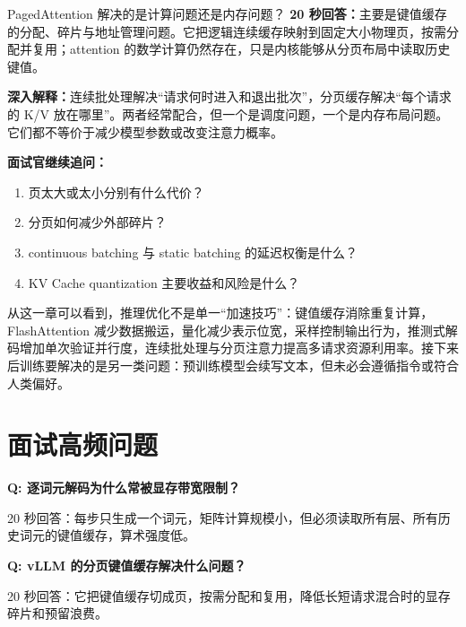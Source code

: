 \begin{interviewbox}{PagedAttention 解决的是计算问题还是内存问题？}
\textbf{20 秒回答：}主要是键值缓存的分配、碎片与地址管理问题。它把逻辑连续缓存映射到固定大小物理页，按需分配并复用；attention 的数学计算仍然存在，只是内核能够从分页布局中读取历史键值。

\textbf{深入解释：}连续批处理解决“请求何时进入和退出批次”，分页缓存解决“每个请求的 K/V 放在哪里”。两者经常配合，但一个是调度问题，一个是内存布局问题。它们都不等价于减少模型参数或改变注意力概率。

\textbf{面试官继续追问：}
\begin{enumerate}
  \item 页太大或太小分别有什么代价？
  \item 分页如何减少外部碎片？
  \item continuous batching 与 static batching 的延迟权衡是什么？
  \item KV Cache quantization 主要收益和风险是什么？
\end{enumerate}
\end{interviewbox}

\figInferenceTimeline

从这一章可以看到，推理优化不是单一“加速技巧”：键值缓存消除重复计算，FlashAttention 减少数据搬运，量化减少表示位宽，采样控制输出行为，推测式解码增加单次验证并行度，连续批处理与分页注意力提高多请求资源利用率。接下来后训练要解决的是另一类问题：预训练模型会续写文本，但未必会遵循指令或符合人类偏好。

\section*{面试高频问题}

\textbf{Q: 逐词元解码为什么常被显存带宽限制？}

20 秒回答：每步只生成一个词元，矩阵计算规模小，但必须读取所有层、所有历史词元的键值缓存，算术强度低。

\textbf{Q: vLLM 的分页键值缓存解决什么问题？}

20 秒回答：它把键值缓存切成页，按需分配和复用，降低长短请求混合时的显存碎片和预留浪费。
